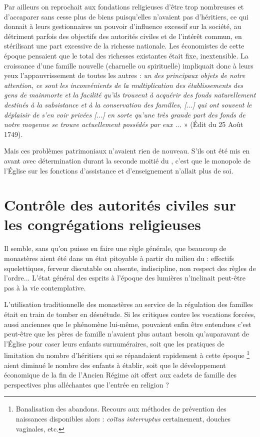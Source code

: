  Par ailleurs on reprochait aux fondations religieuses d'être trop nombreuses et d'accaparer sans cesse plus de biens puisqu'elles n'avaient pas d'héritiers, ce qui donnait à leurs gestionnaires un pouvoir d'influence excessif sur la société, au détriment parfois des objectifs des autorités civiles et de l'intérêt commun, en stérilisant une part excessive de la richesse nationale. Les économistes de cette époque pensaient que le total des richesses existantes était fixe, inextensible. La croissance d'une famille nouvelle (charnelle ou spirituelle) impliquait donc à leurs yeux l'appauvrissement de toutes les autres : \emph{un des principaux objets de notre attention, ce sont les inconvénients de la multiplication des établissements des gens de mainmorte et la facilité qu'ils trouvent à acquérir des fonds naturellement destinés à la subsistance et à la conservation des familles, \emph{[...]} qui ont souvent le déplaisir de s'en voir privées \emph{[...]} en sorte qu'une très grande part des fonds de notre moyenne se trouve actuellement possédés par eux ...} » (Édit du 25 Août 1749). 

 Mais ces problèmes patrimoniaux n'avaient rien de nouveau. S'ils ont été mis en avant avec détermination durant la seconde moitié du , c'est que le monopole de l'Église sur les fonctions d'assistance et d'enseignement n'allait plus de soi. 


\section{Contrôle des autorités civiles sur les congrégations religieuses}

 Il semble, sans qu'on puisse en faire une règle générale, que beaucoup de monastères aient été dans un état pitoyable à partir du milieu du  : effectifs squelettiques, ferveur discutable ou absente, indiscipline, non respect des règles de l'ordre... L'état général des esprits à l'époque des lumières n'inclinait peut-être pas à la vie contemplative.

 L'utilisation traditionnelle des monastères au service de la régulation des familles était en train de tomber en désuétude. Si les critiques contre les vocations forcées, aussi anciennes que le phénomène lui-même, pouvaient enfin être entendues c'est peut-être que les pères de famille n'avaient plus autant besoin qu'auparavant de l'Église pour caser leurs enfants surnuméraires, soit que les pratiques de limitation du nombre d'héritiers qui se répandaient rapidement à cette époque%
\footnote{Banalisation des abandons. Recours aux méthodes de prévention des naissances disponibles alors : \emph{coïtus interruptus} certainement, douches vaginales, etc.} 
aient diminué le nombre des enfants à établir, soit que le développement économique de la fin de l'Ancien Régime ait offert aux cadets de famille des perspectives plus alléchantes que l'entrée en religion ?

